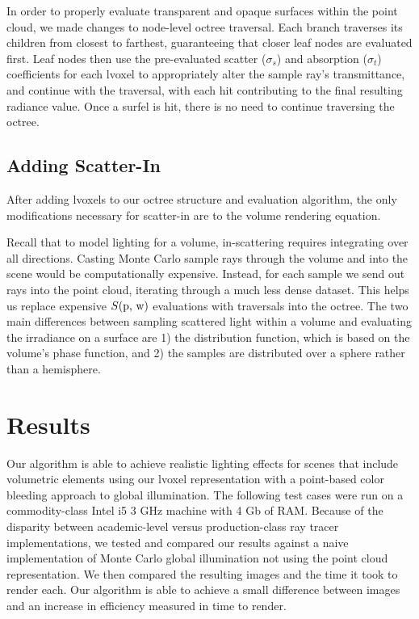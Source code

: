 \documentclass[runningheads]{llncs}
\begin{document}
In order to properly evaluate transparent and opaque surfaces within the point cloud, we made changes to node-level octree traversal.  Each branch traverses its children from closest to farthest, guaranteeing that closer leaf nodes are evaluated first.  Leaf nodes then use the pre-evaluated scatter ($\sigma_{s}$) and absorption ($\sigma_{t}$) coefficients for each lvoxel to appropriately alter the sample ray's transmittance, and continue with the traversal, with each hit contributing to the final resulting radiance value.  Once a surfel is hit, there is no need to continue traversing the octree.


\subsection{Adding Scatter-In}
\label{scatterin_sec}
After adding lvoxels to our octree structure and evaluation algorithm, the only modifications necessary for scatter-in are to the volume rendering equation.  

Recall that to model lighting for a volume, in-scattering requires integrating over all directions.  Casting Monte Carlo sample rays through the volume and into the scene would be computationally expensive.  Instead, for each sample we send out rays into the point cloud, iterating through a much less dense dataset.  This helps us replace expensive $S(\textup{p, w})$ evaluations with traversals into the octree.  The two main differences between sampling scattered light within a volume and evaluating the irradiance on a surface are 1) the distribution function, which is based on the volume's phase function, and 2) the samples are distributed over a sphere rather than a hemisphere.


\section{Results}
Our algorithm is able to achieve realistic lighting effects for scenes that include volumetric elements using our lvoxel representation with a point-based color bleeding approach to global illumination.
The following test cases were run on a commodity-class Intel i5 3 GHz machine with 4 Gb of RAM.  Because of the disparity between academic-level versus production-class ray tracer implementations, we tested and compared our results against a naive implementation of Monte Carlo global illumination not using the point cloud representation.  We then compared the resulting images and the time it took to render each.  Our algorithm is able to achieve a small difference between images and an increase in efficiency measured in time to render.
\end{document}
